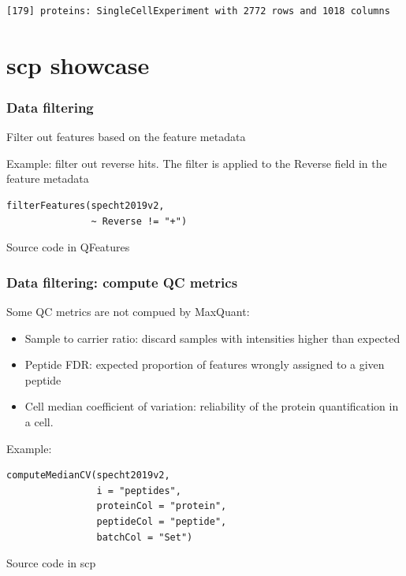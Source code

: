 \documentclass{beamer}
\newcommand{\hcode}[2][lgray]{{\ttfamily\color{vdgray}\colorbox{#1}{#2}}}
\newcommand{\frametitlesection}[1]{\frametitle{\centering #1 \footnotesize \hspace{0pt plus 1 filll} \insertsection}}
\begin{document}
\begin{frame}[fragile]
    \begin{lstlisting}[language = TeX, numbers = none, basicstyle = \ttfamily\@setfontsize{\srcsize}{5pt}{5pt}\color{vdgray}]
 [179] proteins: SingleCellExperiment with 2772 rows and 1018 columns
    \end{lstlisting}


\end{frame}


\section{scp showcase}


\begin{frame}[fragile]
    \frametitlesection{Data filtering}

    Filter out features based on the feature metadata

    \bigskip

    Example: filter out reverse hits. The filter is applied to the
    \hcode{Reverse} field in the feature metadata

    \begin{lstlisting}
filterFeatures(specht2019v2,
               ~ Reverse != "+")
    \end{lstlisting}

    Source code in \hcode{QFeatures}
\end{frame}

\begin{frame}[fragile]
    \frametitlesection{Data filtering: compute QC metrics}
    \small
    Some QC metrics are not compued by MaxQuant:

    \begin{itemize}
        \item{Sample to carrier ratio}: discard samples with intensities higher
        than expected
        \item{Peptide FDR: expected proportion of features wrongly assigned to a
        given peptide}
        \item{Cell median coefficient of variation: reliability of the protein
        quantification in a cell.}
    \end{itemize}

    Example:

    \begin{lstlisting}
computeMedianCV(specht2019v2,
                i = "peptides",
                proteinCol = "protein",
                peptideCol = "peptide",
                batchCol = "Set")
    \end{lstlisting}

    Source code in \hcode{scp}

\end{frame}
\end{document}
